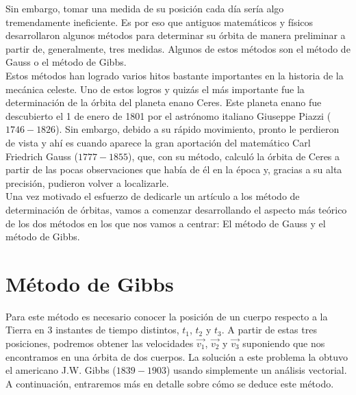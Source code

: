 \documentclass{article}
\numberwithin{equation}{section}
\begin{document}
Sin embargo, tomar una medida de su posición cada día sería 
algo tremendamente ineficiente. Es por eso que antiguos 
matemáticos y físicos desarrollaron algunos métodos para 
determinar su órbita de manera preliminar a partir de, generalmente, 
tres medidas. Algunos de estos métodos son el método de 
Gauss o el método de Gibbs. \\

Estos métodos han logrado varios hitos bastante importantes 
en la historia de la mecánica celeste. Uno de estos logros 
y quizás el más importante fue la determinación de la órbita 
del planeta enano Ceres. Este planeta enano fue descubierto 
el 1 de enero de 1801 por el astrónomo italiano Giuseppe Piazzi ($1746-1826$). 
Sin embargo, debido a su rápido movimiento, pronto le perdieron 
de vista y ahí es cuando aparece la gran aportación del matemático Carl Friedrich Gauss ($1777-1855$), 
que, con su método, calculó la órbita de Ceres a partir de 
las pocas observaciones que había de él en la época y, gracias 
a su alta precisión, pudieron volver a localizarle. \\

Una vez motivado el esfuerzo de dedicarle un artículo a los 
método de determinación de órbitas, vamos a comenzar desarrollando 
el aspecto más teórico de los dos métodos en los que nos 
vamos a centrar: El método de Gauss y el método de Gibbs.
\section{Método de Gibbs}
Para este método es necesario conocer la posición de un cuerpo 
respecto a la Tierra en 3 instantes de tiempo distintos, 
$t_{1}$, $t_{2}$ y $t_{3}$. A partir de estas tres posiciones, 
podremos obtener las velocidades $\overrightarrow{v_{1}}$, 
$\overrightarrow{v_{2}}$ y $\overrightarrow{v_{3}}$ suponiendo 
que nos encontramos en una órbita de dos cuerpos. La solución a 
este problema la obtuvo el americano J.W. Gibbs ($1839-1903$) 
usando simplemente un análisis vectorial. A continuación, 
entraremos más en detalle sobre cómo se deduce este método.
\end{document}

